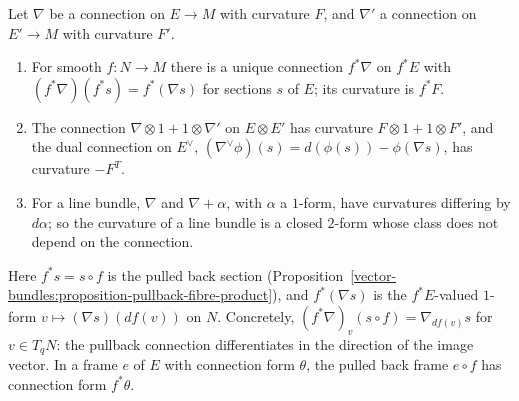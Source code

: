 \begin{proposition}\label{connections:proposition-pullback-tensor}
Let $\nabla$ be a connection on $E \to M$ with curvature $F$, and $\nabla'$ a connection on $E' \to M$ with curvature $F'$.
\begin{enumerate}
\item For smooth $f \colon N \to M$ there is a unique connection $f^*\nabla$ on $f^*E$ with $(f^*\nabla)(f^*s) = f^*(\nabla s)$ for sections $s$ of $E$; its curvature is $f^*F$.
\item The connection $\nabla \otimes 1 + 1 \otimes \nabla'$ on $E \otimes E'$ has curvature $F \otimes 1 + 1 \otimes F'$, and the dual connection on $E^\vee$, $(\nabla^\vee\phi)(s) = d(\phi(s)) - \phi(\nabla s)$, has curvature $-F^T$.
\item For a line bundle, $\nabla$ and $\nabla + \alpha$, with $\alpha$ a $1$-form, have curvatures differing by $d\alpha$; so the curvature of a line bundle is a closed $2$-form whose class does not depend on the connection.
\end{enumerate}
\end{proposition}

Here $f^*s = s \circ f$ is the pulled back section (Proposition~\ref{vector-bundles:proposition-pullback-fibre-product}), and $f^*(\nabla s)$ is the $f^*E$-valued $1$-form
$v \mapsto (\nabla s)(df(v))$ on $N$. Concretely, $(f^*\nabla)_v(s \circ f) = \nabla_{df(v)}s$ for $v \in T_qN$: the pullback connection differentiates in the direction of the image
vector. In a frame $e$ of $E$ with connection form $\theta$, the pulled back frame $e \circ f$ has connection form $f^*\theta$.

